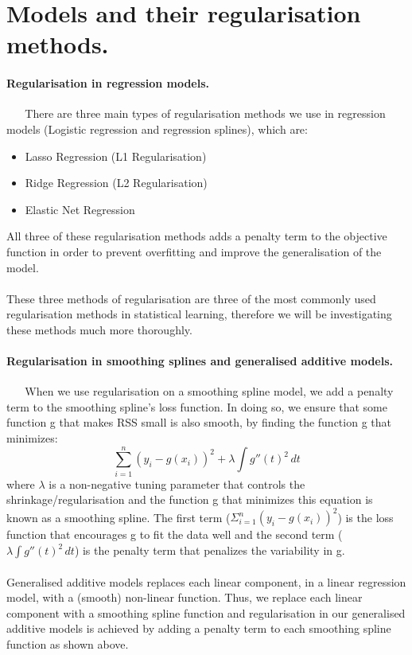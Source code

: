 \documentclass[12pt]{article}
\begin{document}
\section*{Models and their regularisation methods.}

\paragraph{Regularisation in regression models.}~
\newline~
There are three main types of regularisation methods we use in regression models (Logistic regression and regression splines), which are:
\begin{itemize}
    \item Lasso Regression (L1 Regularisation)
    \item Ridge Regression (L2 Regularisation)
    \item Elastic Net Regression
\end{itemize}
All three of these regularisation methods adds a penalty term to the objective function
in order to prevent overfitting and improve the generalisation of the model. \\ \\
These three methods of regularisation are three of the most commonly used regularisation methods
in statistical learning, therefore we will be investigating these methods much more thoroughly.

\paragraph{Regularisation in smoothing splines and generalised additive models.}~
\newline~
When we use regularisation on a smoothing spline model, we add a penalty term to the smoothing spline's
loss function. In doing so, we ensure that some function g that makes RSS small is also smooth, by finding the function
g that minimizes: $$ \sum_{i=1}^{n}(y_i-g(x_i))^2 + \lambda \int g''(t)^2 \,dt  $$ where $\lambda$ is a non-negative tuning parameter
that controls the shrinkage/regularisation and the function g that minimizes this equation is known as a smoothing spline.
The first term ($\Sigma_{i=1}^{n}(y_i-g(x_i))^2$) is the loss function that encourages g to fit the data well
and the second term ($\lambda \int g''(t)^2 \,dt$) is the penalty term that penalizes the variability in g.
\\ \\
Generalised additive models replaces each linear component, in a linear regression model, with a (smooth) non-linear function.
Thus, we replace each linear component with a smoothing spline function and regularisation in our generalised additive models is
achieved by adding a penalty term to each smoothing spline function as shown above.
\end{document}
